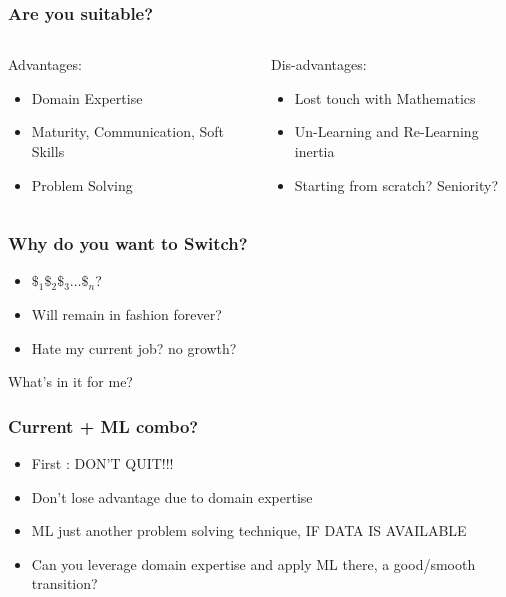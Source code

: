 \begin{frame}[fragile]\frametitle{Are you suitable? }
\begin{columns}
    \begin{column}[T]{0.5\linewidth}
		Advantages:
      \begin{itemize}
			\item Domain Expertise
			\item Maturity, Communication, Soft Skills
			\item Problem Solving
			\end{itemize}
		\end{column}
    \begin{column}[T]{0.5\linewidth}
		
		Dis-advantages:
      \begin{itemize}
			\item Lost touch with Mathematics
			\item Un-Learning and Re-Learning inertia
			\item Starting from scratch? Seniority?
			\end{itemize}
    \end{column}
  \end{columns}
\end{frame}

\begin{frame}[fragile]\frametitle{Why do you want to Switch?}

      \begin{itemize}
			\item $\$_1\$_2\$_3 \ldots \$_n$?
			\item Will remain in fashion forever?
			\item Hate my current job? no growth?
			\end{itemize}
			
			What's in it for me?
\end{frame}

\begin{frame}[fragile]\frametitle{Current + ML combo?}

      \begin{itemize}
			\item First : DON'T QUIT!!!
			\item Don't lose advantage due to domain expertise
			\item ML just another problem solving technique, IF DATA IS AVAILABLE
			\item Can you leverage domain expertise and apply ML there, a good/smooth transition?
			\end{itemize}
			
\end{frame}

